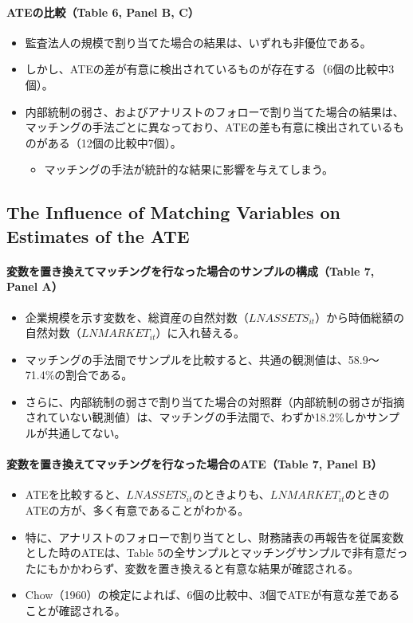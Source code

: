 \paragraph{ATEの比較（Table 6, Panel B, C）}

\begin{itemize}
 \item 監査法人の規模で割り当てた場合の結果は、いずれも非優位である。
 \item しかし、ATEの差が有意に検出されているものが存在する（6個の比較中3個）。
 \item 内部統制の弱さ、およびアナリストのフォローで割り当てた場合の結果は、マッチングの手法ごとに異なっており、ATEの差も有意に検出されているものがある（12個の比較中7個）。
  \begin{itemize}
   \item マッチングの手法が統計的な結果に影響を与えてしまう。
  \end{itemize}
\end{itemize}

\subsection*{The Influence of Matching Variables on Estimates of the ATE}

\paragraph{変数を置き換えてマッチングを行なった場合のサンプルの構成（Table 7, Panel A）}

\begin{itemize}
 \item 企業規模を示す変数を、総資産の自然対数（$\mathit{LNASSETS}_{it}$）から時価総額の自然対数（$\mathit{LNMARKET}_{it}$）に入れ替える。
 \item マッチングの手法間でサンプルを比較すると、共通の観測値は、58.9〜71.4\%の割合である。
 \item さらに、内部統制の弱さで割り当てた場合の対照群（内部統制の弱さが指摘されていない観測値）は、マッチングの手法間で、わずか18.2\%しかサンプルが共通してない。
\end{itemize}

\paragraph{変数を置き換えてマッチングを行なった場合のATE（Table 7, Panel B）}

\begin{itemize}
 \item ATEを比較すると、$\mathit{LNASSETS}_{it}$のときよりも、$\mathit{LNMARKET}_{it}$のときのATEの方が、多く有意であることがわかる。
 \item 特に、アナリストのフォローで割り当てとし、財務諸表の再報告を従属変数とした時のATEは、Table 5の全サンプルとマッチングサンプルで非有意だったにもかかわらず、変数を置き換えると有意な結果が確認される。
 \item Chow（1960）の検定によれば、6個の比較中、3個でATEが有意な差であることが確認される。
\end{itemize}

